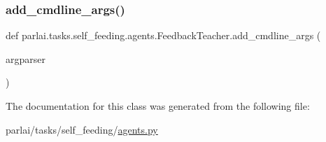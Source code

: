 \subsubsection{\texorpdfstring{add\+\_\+cmdline\+\_\+args()}{add\_cmdline\_args()}}
{\footnotesize\ttfamily def parlai.\+tasks.\+self\+\_\+feeding.\+agents.\+Feedback\+Teacher.\+add\+\_\+cmdline\+\_\+args (\begin{DoxyParamCaption}\item[{}]{argparser }\end{DoxyParamCaption})\hspace{0.3cm}{\ttfamily [static]}}



The documentation for this class was generated from the following file\+:\begin{DoxyCompactItemize}
\item 
parlai/tasks/self\+\_\+feeding/\hyperlink{parlai_2tasks_2self__feeding_2agents_8py}{agents.\+py}\end{DoxyCompactItemize}
